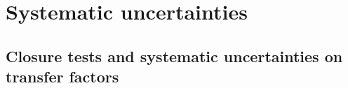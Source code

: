 \section{Systematic uncertainties}
\label{sec:systematics}



%
%
%
%

\subsection{Closure tests and systematic uncertainties on transfer factors\label{sec:bkgd-syst}}

